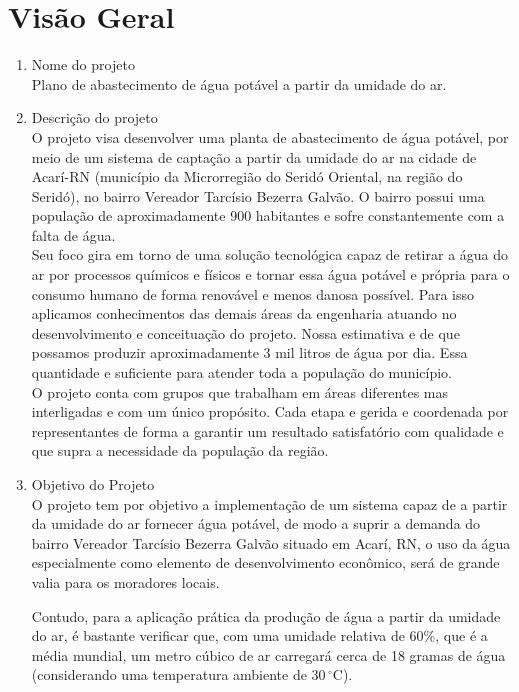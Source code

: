 \section*{Visão Geral}
\begin{enumerate}
  
  \item Nome do projeto\\
  Plano de abastecimento de água potável a partir da umidade do ar.
  
  \item Descrição do projeto\\
  O projeto visa desenvolver uma planta de abastecimento de água potável, por meio de um sistema de captação a partir da umidade do ar na cidade de Acarí-RN (município da Microrregião do Seridó Oriental, na região do Seridó), no bairro Vereador Tarcísio Bezerra Galvão. O bairro possui uma população de aproximadamente 900 habitantes e sofre constantemente com a falta de água. \\
  Seu foco gira em torno de uma solução tecnológica  capaz de retirar a água do ar  por processos químicos e físicos e tornar essa água potável e própria para o consumo humano de forma renovável e menos danosa possível. Para isso aplicamos conhecimentos das demais áreas da engenharia atuando no desenvolvimento e conceituação do projeto. Nossa estimativa e de que possamos produzir aproximadamente 3 mil litros de água por dia. Essa quantidade e suficiente para atender toda a população do município. \\
  O projeto conta com grupos que trabalham em áreas diferentes mas interligadas e com um único propósito. Cada etapa e gerida e coordenada por representantes de forma a garantir um resultado satisfatório com qualidade e que supra a necessidade da população da região.

  \item Objetivo do Projeto\\
  O projeto tem por objetivo a implementação de um sistema capaz de a partir da  umidade do ar fornecer água potável, de modo a suprir a demanda do bairro Vereador Tarcísio Bezerra Galvão situado em Acarí, RN, o  uso da água especialmente como elemento de desenvolvimento econômico, será de grande valia para os moradores locais.

  Contudo, para a aplicação prática da produção de água a partir da umidade do ar, é bastante verificar que, com uma umidade relativa de 60\%, que é a média mundial, um metro cúbico de ar carregará cerca de 18 gramas de água (considerando uma temperatura ambiente de $30\,^{\circ}\mathrm{C}$). 


\end{enumerate}

